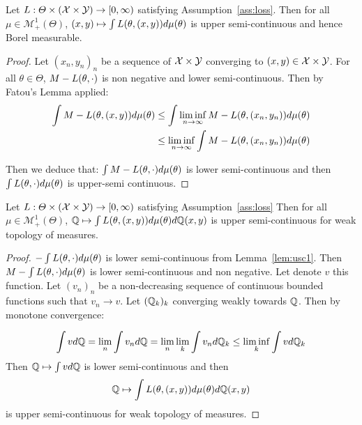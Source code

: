 \begin{lemma}
\label{lem:usc1}
Let $L:\Theta\times(\mathcal{X}\times\mathcal{Y})\rightarrow [0,\infty)$ satisfying Assumption~\ref{ass:loss}.
Then for all $\mu\in\mathcal{M}^1_+(\Theta)$, $(x,y)\mapsto\int L(\theta,(x,y))d\mu(\theta)$ is upper semi-continuous and hence Borel measurable.  
\end{lemma}
\begin{proof}
Let $(x_n,y_n)_n$ be a sequence of $\mathcal{X}\times\mathcal{Y}$ converging to $(x,y)\in\mathcal{X}\times\mathcal{Y}$.  For all $\theta\in\Theta$, $M-L(\theta,\cdot)$ is non negative and lower semi-continuous. Then by Fatou's Lemma applied:
\begin{align*}
   \int M-L(\theta,(x,y))d\mu(\theta)&\leq\int \liminf_{n\to\infty}  M-L(\theta,(x_n,y_n))d\mu(\theta)\\
   &\leq  \liminf_{n\to\infty}  \int M-L(\theta,(x_n,y_n))d\mu(\theta) 
\end{align*}

Then we deduce that: $\int M- L(\theta,\cdot)d\mu(\theta)$ is lower semi-continuous and then $\int L(\theta,\cdot)d\mu(\theta)$ is upper-semi continuous.
\end{proof}


\begin{lemma}
\label{lem:usc2}

Let $L:\Theta\times(\mathcal{X}\times\mathcal{Y})\rightarrow [0,\infty)$ satisfying Assumption~\ref{ass:loss}
Then for all $\mu\in\mathcal{M}^1_+(\Theta)$, $\mathbb{Q}\mapsto\int L(\theta,(x,y))d\mu(\theta)d\mathbb{Q}(x,y)$ is upper semi-continuous for weak topology of measures. 
\end{lemma}
\begin{proof}
 $-\int L(\theta,\cdot)d\mu(\theta) $ is lower semi-continuous from Lemma~\ref{lem:usc1}. Then $M-\int L(\theta,\cdot)d\mu(\theta) $ is lower semi-continuous and non negative. Let denote $v$ this function. Let $(v_n)_n$ be a non-decreasing sequence of continuous bounded functions such that $v_n\to v$. Let $(\mathbb{Q}_k)_k$ converging weakly towards $\mathbb{Q}$. Then by monotone convergence:
 
 \begin{align*}
     \int vd\mathbb{Q} = \lim_n \int v_nd\mathbb{Q} =\lim_n \lim_k\int v_nd\mathbb{Q}_k\leq \liminf_k \int vd\mathbb{Q}_k
 \end{align*}
 Then $\mathbb{Q}\mapsto\int vd\mathbb{Q}$ is lower semi-continuous and then 
 \begin{align*}
    \mathbb{Q}\mapsto\int L(\theta,(x,y))d\mu(\theta)d\mathbb{Q}(x,y)
 \end{align*}
  is upper semi-continuous for weak topology of measures. 
 \end{proof}



